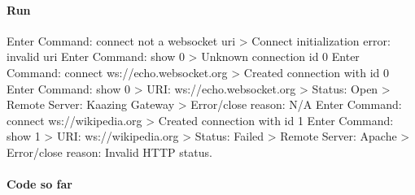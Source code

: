 \paragraph*{Run}


\begin{DoxyCode}
Enter Command: connect not a websocket uri
> Connect initialization error: invalid uri
Enter Command: show 0
> Unknown connection id 0
Enter Command: connect ws://echo.websocket.org
> Created connection with id 0
Enter Command: show 0
> URI: ws://echo.websocket.org
> Status: Open
> Remote Server: Kaazing Gateway
> Error/close reason: N/A
Enter Command: connect ws://wikipedia.org
> Created connection with id 1
Enter Command: show 1
> URI: ws://wikipedia.org
> Status: Failed
> Remote Server: Apache
> Error/close reason: Invalid HTTP status.
\end{DoxyCode}


\paragraph*{Code so far}



